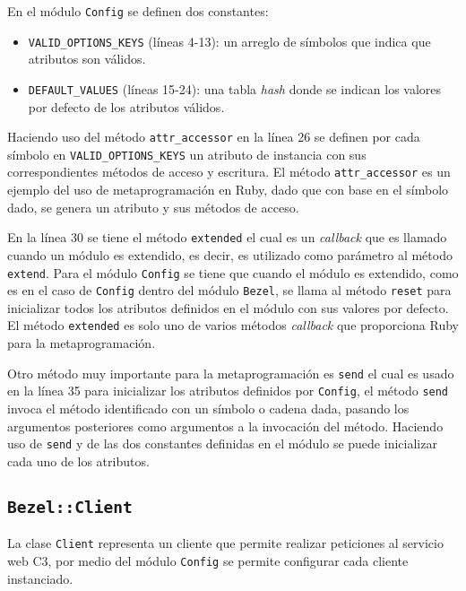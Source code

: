 En el módulo \texttt{Config} se definen dos constantes:

\begin{itemize}
\item \texttt{VALID\_OPTIONS\_KEYS} (líneas 4-13): un arreglo de símbolos que indica
  que atributos son válidos.
\item \texttt{DEFAULT\_VALUES} (líneas 15-24): una tabla \textit{hash} donde se
  indican los valores por defecto de los atributos válidos.
\end{itemize}

Haciendo uso del método \texttt{attr\_accessor} en la línea 26 se definen por cada
símbolo en \texttt{VALID\_OPTIONS\_KEYS} un atributo de instancia con sus
correspondientes métodos de acceso y escritura. El método \texttt{attr\_accessor} es
un ejemplo del uso de metaprogramación en Ruby, dado que con base en el símbolo
dado, se genera un atributo y sus métodos de acceso.

En la línea 30 se tiene el método \texttt{extended} el cual es un \textit{callback}
que es llamado cuando un módulo es extendido, es decir, es utilizado como parámetro
al método \texttt{extend}. Para el módulo \texttt{Config} se tiene que cuando el
módulo es extendido, como es en el caso de \texttt{Config} dentro del módulo
\texttt{Bezel}, se llama al método \texttt{reset} para inicializar todos los
atributos definidos en el módulo con sus valores por defecto.
El método \texttt{extended} es solo uno de varios métodos \textit{callback} que
proporciona Ruby para la metaprogramación.

Otro método muy importante para la metaprogramación es \texttt{send} el cual es usado
en la línea 35 para inicializar los atributos definidos por \texttt{Config}, el
método \texttt{send} invoca el método identificado con un símbolo o cadena dada,
pasando los argumentos posteriores como argumentos a la invocación del método.
Haciendo uso de \texttt{send} y de las dos constantes definidas en el módulo
se puede inicializar cada uno de los atributos.

\subsection{\texttt{Bezel::Client}}

La clase \texttt{Client} representa un cliente que permite realizar peticiones al
servicio web C3, por medio del módulo \texttt{Config} se permite configurar
cada cliente instanciado.



